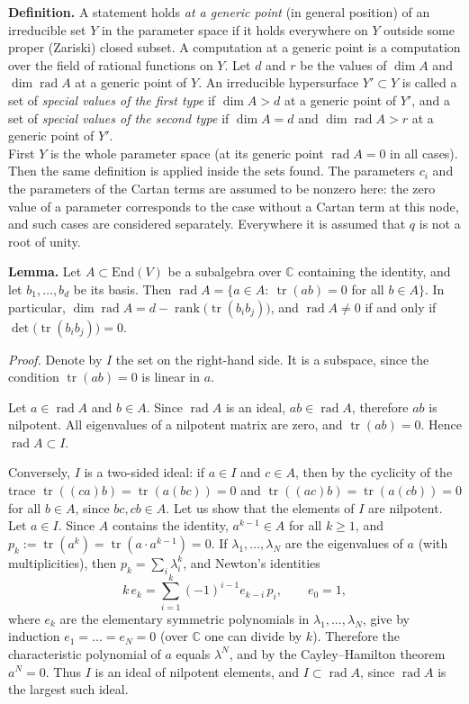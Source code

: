 \documentclass[12pt,a4paper]{article}
\begin{document}
\textbf{Definition.} A statement holds \emph{at a generic point} (in general position) of an irreducible set $Y$ in the parameter space if it holds
everywhere on $Y$ outside some proper (Zariski) closed subset. A computation at a generic point is a
computation over the field of rational functions on $Y$. Let $d$ and $r$ be the values of $\dim A$ and $\dim\operatorname{rad}A$ at
a generic point of $Y$. An irreducible hypersurface $Y'\subset Y$ is called a set of \emph{special values of the first type}
if $\dim A>d$ at a generic point of $Y'$, and a set of \emph{special values of the second type} if
$\dim A=d$ and $\dim\operatorname{rad}A>r$ at a generic point of $Y'$. \\

First $Y$ is the whole parameter space (at its generic point $\operatorname{rad}A=0$ in all cases). Then the same definition is applied inside
the sets found. The parameters $c_i$ and the parameters
of the Cartan terms are assumed to be nonzero here: the zero value of a parameter corresponds to the case
without a Cartan term at this node, and such cases are considered separately. Everywhere it is assumed that $q$ is not a root of unity.

\textbf{Lemma.} Let $A\subset\mathrm{End}(V)$ be a subalgebra over $\mathbb C$ containing the identity, and let
$b_1,\dots,b_d$ be its basis. Then $\operatorname{rad}A=\{a\in A:\ \operatorname{tr}(ab)=0$ for all $b\in A\}$. In
particular, $\dim\operatorname{rad}A=d-\operatorname{rank}\bigl(\operatorname{tr}(b_ib_j)\bigr)$, and $\operatorname{rad}A\neq0$
if and only if $\det\bigl(\operatorname{tr}(b_ib_j)\bigr)=0$.

\textit{Proof.} Denote by $I$ the set on the right-hand side. It is a subspace, since
the condition $\operatorname{tr}(ab)=0$ is linear in $a$.

Let $a\in\operatorname{rad}A$ and $b\in A$. Since $\operatorname{rad}A$ is an ideal, $ab\in\operatorname{rad}A$, therefore
$ab$ is nilpotent. All eigenvalues of a nilpotent matrix are zero, and $\operatorname{tr}(ab)=0$. Hence
$\operatorname{rad}A\subset I$.

Conversely, $I$ is a two-sided ideal: if $a\in I$ and $c\in A$, then by the cyclicity of the trace
$\operatorname{tr}((ca)b)=\operatorname{tr}(a(bc))=0$ and $\operatorname{tr}((ac)b)=\operatorname{tr}(a(cb))=0$ for all
$b\in A$, since $bc,cb\in A$. Let us show that the elements of $I$ are nilpotent. Let $a\in I$. Since $A$ contains
the identity, $a^{k-1}\in A$ for all $k\geqslant1$, and $p_k:=\operatorname{tr}(a^k)=\operatorname{tr}(a\cdot a^{k-1})=0$.
If $\lambda_1,\dots,\lambda_N$ are the eigenvalues of $a$ (with multiplicities), then $p_k=\sum_i\lambda_i^k$, and Newton's
identities
\[
k\,e_k=\sum_{i=1}^{k}(-1)^{i-1}e_{k-i}\,p_i,\qquad e_0=1,
\]
where $e_k$ are the elementary symmetric polynomials in $\lambda_1,\dots,\lambda_N$, give by induction
$e_1=\dots=e_N=0$ (over $\mathbb C$ one can divide by $k$). Therefore the characteristic polynomial of $a$ equals
$\lambda^N$, and by the Cayley--Hamilton theorem $a^N=0$. Thus $I$ is an ideal of nilpotent elements, and
$I\subset\operatorname{rad}A$, since $\operatorname{rad}A$ is the largest such ideal.
\end{document}

